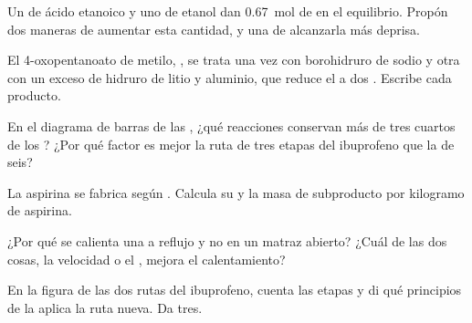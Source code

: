 \begin{exercise}[$\star\star$]\label{exo:g12:synthesis-strategy:6}
Un  de ácido etanoico y uno de etanol dan \qty{0.67}{mol} de  en
el equilibrio. Propón dos maneras de aumentar esta cantidad, y una de
alcanzarla más deprisa.
\end{exercise}

\begin{exercise}[$\star\star$]\label{exo:g12:synthesis-strategy:7}
El 4-oxopentanoato de metilo, , se trata una
vez con borohidruro de sodio y otra con un exceso de hidruro de litio y
aluminio, que reduce el  a dos . Escribe cada producto.
\end{exercise}

\begin{exercise}[$\star\star$]\label{exo:g12:synthesis-strategy:8}
En el diagrama de barras de las , ¿qué reacciones
conservan más de tres cuartos de los ? ¿Por qué factor es mejor la
ruta de tres etapas del ibuprofeno que la de seis?
\end{exercise}

\begin{exercise}[$\star\star$]\label{exo:g12:synthesis-strategy:9}
La aspirina se fabrica según .
Calcula su  y la masa de subproducto por kilogramo de
aspirina.
\end{exercise}

\begin{exercise}[$\star\star$]\label{exo:g12:synthesis-strategy:10}
¿Por qué se calienta una  a reflujo y no en un matraz abierto?
¿Cuál de las dos cosas, la velocidad o el , mejora el
calentamiento?
\end{exercise}

\begin{exercise}[$\star\star$]\label{exo:g12:synthesis-strategy:11}
En la figura de las dos rutas del ibuprofeno, cuenta las etapas y di qué
principios de la  aplica la ruta nueva. Da tres.
\end{exercise}

